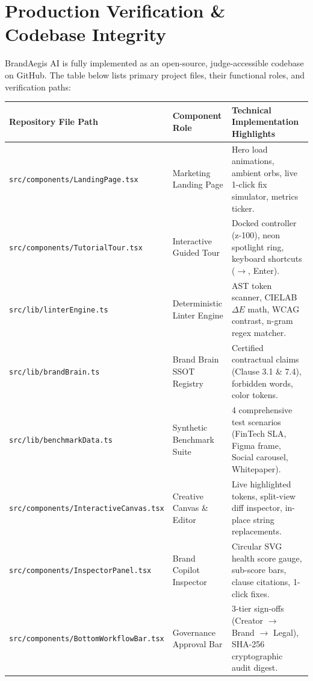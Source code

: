 \documentclass[10pt,a4paper]{article}
\begin{document}
\newpage

\section{Production Verification \& Codebase Integrity}
BrandAegis AI is fully implemented as an open-source, judge-accessible codebase on GitHub. The table below lists primary project files, their functional roles, and verification paths:

\begin{table}[h]
\centering
\footnotesize
\begin{tabularx}{\textwidth}{p{4.2cm}p{3.2cm}X}
\toprule
\textbf{Repository File Path} & \textbf{Component Role} & \textbf{Technical Implementation Highlights} \\
\midrule
\texttt{src/components/LandingPage.tsx} & Marketing Landing Page & Hero load animations, ambient orbs, live 1-click fix simulator, metrics ticker. \\
\texttt{src/components/TutorialTour.tsx} & Interactive Guided Tour & Docked controller (z-100), neon spotlight ring, keyboard shortcuts ($\rightarrow$, Enter). \\
\texttt{src/lib/linterEngine.ts} & Deterministic Linter Engine & AST token scanner, CIELAB $\Delta E$ math, WCAG contrast, n-gram regex matcher. \\
\texttt{src/lib/brandBrain.ts} & Brand Brain SSOT Registry & Certified contractual claims (Clause 3.1 \& 7.4), forbidden words, color tokens. \\
\texttt{src/lib/benchmarkData.ts} & Synthetic Benchmark Suite & 4 comprehensive test scenarios (FinTech SLA, Figma frame, Social carousel, Whitepaper). \\
\texttt{src/components/InteractiveCanvas.tsx} & Creative Canvas \& Editor & Live highlighted tokens, split-view diff inspector, in-place string replacements. \\
\texttt{src/components/InspectorPanel.tsx} & Brand Copilot Inspector & Circular SVG health score gauge, sub-score bars, clause citations, 1-click fixes. \\
\texttt{src/components/BottomWorkflowBar.tsx} & Governance Approval Bar & 3-tier sign-offs (Creator $\rightarrow$ Brand $\rightarrow$ Legal), SHA-256 cryptographic audit digest. \\
\bottomrule
\end{tabularx}
\end{table}
\end{document}
